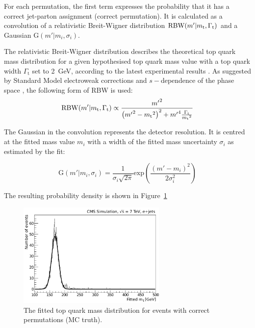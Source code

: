 For each permutation, the first term expresses the probability that it has a correct jet-parton assignment (correct
permutation). It is calculated as a convolution of a relativistic Breit-Wigner distribution
$\textrm{RBW}(m'|m_\mathrm{t},\Gamma_{\textrm{t}})$ and a Gaussian $\textrm{G}(m'|m_{i},\sigma_{i})$.

The relativistic Breit-Wigner distribution describes the theoretical top quark mass distribution for a given
hypothesised top quark mass value \mtop with a top quark width $\Gamma_{\textrm{t}}$ set to \SI{2}{\GeV}, according to
the latest experimental results \autocite{top_width_D0}. As suggested by Standard Model electroweak corrections and
$s-$dependence of the phase space \cite{aleph_Z_RBW}, the following form of RBW is used:
\begin{equation}
\textrm{RBW}(m'|m_\mathrm{t},\Gamma_{\textrm{t}}) \propto \frac{{m'}^{2}}{\left({m'}^{2} - {m_\mathrm{t}}^{2}
\right)^{2} + {m'}^{4}\frac{\Gamma_{\textrm{t}}}{{m_\mathrm{t}}^{2}}}
\end{equation}

The Gaussian in the convolution represents the detector resolution. It is centred at the fitted mass value $m_{i}$ with
a width of the fitted mass uncertainty $\sigma_{i}$ as estimated by the fit:

\begin{equation}
\textrm{G}(m'|m_{i},\sigma_{i}) = \frac{1}{\sigma_{i}\sqrt{2\pi}}
\textrm{exp}\left(\frac{(m'-m_{i})^{2}}{2\sigma_{i}^2}\right)
\end{equation}

The resulting probability density is shown in Figure~\ref{fig:fitted_ttbar_cp_density}

\begin{figure}[!htpb]
\begin{center}
    \includegraphics[width=0.65\textwidth]{correct_permutations_fitted_top_mass}
	\caption{\label{fig:fitted_ttbar_cp_density}
	The fitted top quark mass distribution for \ttbar events with correct permutations (MC truth).}
\end{center}
\end{figure}

